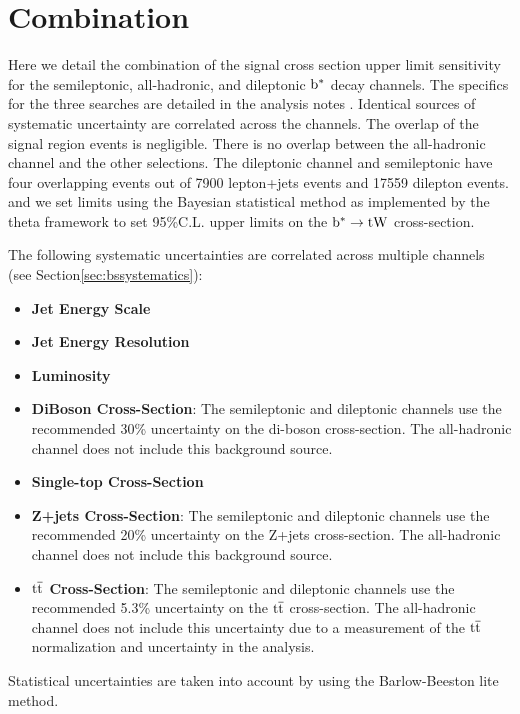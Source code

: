 \section{Combination}	
\label{sec:bsintro} 
Here we detail the combination of the signal cross section upper limit sensitivity for the semileptonic, all-hadronic, and dileptonic $\mathrm{b}^{*}$ decay channels.  
The specifics for the three searches are detailed in the analysis notes \cite{CMS-AN-14-049,CMS-AN-14-103,CMS-AN-13-415}.  Identical sources of systematic uncertainty are 
correlated across the channels.  The overlap of the signal region events is negligible.  There is no overlap between the all-hadronic channel and the other selections.  
The dileptonic channel and semileptonic have four overlapping events out of 7900 lepton+jets events and 17559 dilepton events.
and we set limits using the Bayesian statistical method as implemented by the theta 
framework to set 95\%C.L. upper limits on the $\mathrm{b}^{*} \to \mathrm{tW}$ cross-section.

The following systematic uncertainties are correlated across multiple channels (see Section\ref{sec:bssystematics}):
	
\begin{itemize}
\item \textbf{Jet Energy Scale}
\item \textbf{Jet Energy Resolution}
\item \textbf{Luminosity}
\item \textbf{DiBoson Cross-Section}:  The semileptonic and dileptonic channels use the recommended 30\% uncertainty on the di-boson cross-section.  The all-hadronic channel does not 
include this background source.
\item \textbf{Single-top Cross-Section}
\item \textbf{Z+jets Cross-Section}:  The semileptonic and dileptonic channels use the recommended 20\% uncertainty on the Z+jets cross-section.  The all-hadronic channel does not 
include this background source.
\item \textbf{$\mathrm{t\overline{t}}$ Cross-Section}:  The semileptonic and dileptonic channels use the recommended 5.3\% uncertainty on the $\mathrm{t\overline{t}}$ cross-section.  The all-hadronic channel does not 
include this uncertainty due to a measurement of the $\mathrm{t\overline{t}}$ normalization and uncertainty in the analysis.
\end{itemize}

Statistical uncertainties are taken into account by using the Barlow-Beeston lite method.


